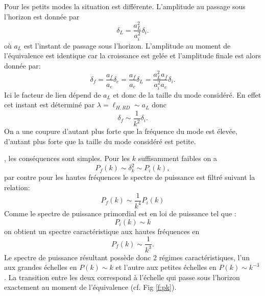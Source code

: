 Pour les petits modes la situation est différente. L'amplitude au passage sous l'horizon est donnée par
\begin{equation}
\delta_L=\frac{a_L^2}{a_i^2}\delta_i.
\end{equation}
où $a_L$ est l'instant de passage sous l'horizon. L'amplitude au moment de l'équivalence est identique car la croissance est gelée et l'amplitude finale est alors donnée par:
\begin{equation}
\delta_f=\frac{a_f}{a_e}\delta_e=\frac{a_f}{a_e}\delta_L=\frac{a_L^2 a_f}{a_i^2 a_e}\delta_i.
\end{equation}
Ici le facteur de lien dépend de $a_L$ et donc de la taille du mode considéré. En effet cet instant est déterminé par $\lambda = \ell_{H,RD} \sim a_L$ donc 
\begin{equation}
\delta_f \sim \frac{1}{k^2} \delta_i.
\end{equation}
On a une coupure d'autant plus forte que la fréquence du mode est élevée, d'autant plus forte que la taille du mode considéré est petite.

, les conséquences sont simples. Pour les $k$ suffisamment faibles on a 
\begin{equation}
P_f(k)\sim\delta_k^2 \sim P_i(k),
\end{equation}
par contre pour les hautes fréquences le spectre de puissance est filtré suivant la relation:
\begin{equation}
P_f(k)\sim \frac{1}{k^4} P_i(k)
\end{equation}
Comme le spectre de puissance primordial est en loi de puissance tel que :
\begin{equation}
P_i(k)\sim k
\end{equation}
on obtient un spectre caractéristique aux hautes fréquences en 
\begin{equation}
P_f(k)\sim\frac{1}{k^3}.
\end{equation}
Le spectre de puissance résultant possède donc 2 régimes caractéristiques, l'un aux grandes échelles en $P(k)\sim k$ et l'autre aux petites échelles en $P(k)\sim k^{-3}$. La transition entre les deux correspond à l'échelle qui passe sous l'horizon exactement au moment de l'équivalence (cf. Fig \ref{f:pk}).

